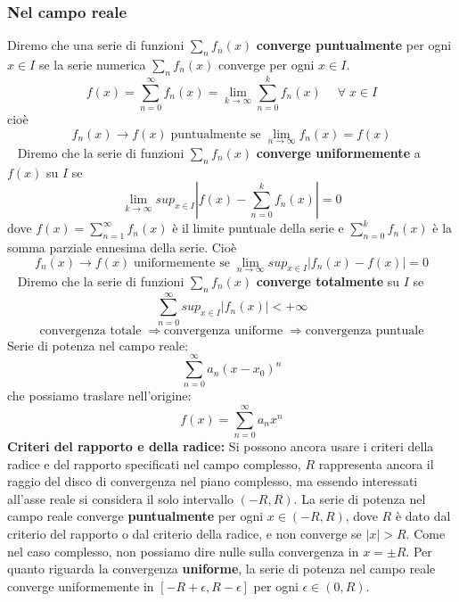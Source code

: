 \subsubsection{Nel campo reale}
Diremo che una serie di funzioni $\sum_{n}f_n(x)$ \textbf{converge puntualmente} per ogni $x \in I$ se la serie numerica $\sum_{n}f_n(x)$ converge per ogni $x \in I$.
\[
    f(x) = \sum_{n=0}^{\infty} f_n(x) = \lim_{k\rightarrow \infty} \sum_{n=0}^{k} f_n(x) \quad \;\forall\;x \in I
\]
cioè
\[
    f_n(x) \rightarrow f(x) \; \text{puntualmente se}\; \lim_{n\rightarrow \infty} f_n(x) = f(x) 
\]
\ \newline
Diremo che la serie di funzioni $\sum_{n}f_n(x)$ \textbf{converge uniformemente} a $f(x)$ su $I$ se
\[
    \lim_{k\rightarrow \infty} sup_{x \in I}\left| f(x) - \sum_{n=0}^{k}f_n(x) \right| = 0
\]
dove $f(x) = \sum_{n=1}^{\infty} f_n(x)$ è il limite puntuale della serie e $\sum_{n=0}^{k} f_n(x)$ è la somma parziale ennesima della serie.\newline
Cioè
\[
    f_n(x) \rightarrow f(x) \; \text{uniformemente se}\; \lim_{n\rightarrow \infty} sup_{x \in I}\left| f_n(x) - f(x) \right| = 0
\]
\ \newline
Diremo che la serie di funzioni $\sum_{n}f_n(x)$ \textbf{converge totalmente} su $I$ se
\[
    \sum_{n=0}^{\infty} sup_{x \in I}\left| f_n(x) \right| < + \infty
\]
\newline
\[
    \text{convergenza totale}\; \Longrightarrow \text{convergenza uniforme}\; \Longrightarrow \text{convergenza puntuale}
\]
\newline
Serie di potenza nel campo reale:
\[
    \sum_{n=0}^{\infty} a_n(x-x_0)^n
\]
che possiamo traslare nell'origine:
\[
    f(x) = \sum_{n=0}^{\infty} a_n x^n
\]
\newline
\textbf{Criteri del rapporto e della radice:} Si possono ancora usare i criteri della radice e del rapporto specificati nel campo complesso, $R$ rappresenta ancora il raggio del disco di convergenza nel piano complesso, ma essendo interessati all'asse reale si considera il solo intervallo $(-R, R)$.\newline
La serie di potenza nel campo reale converge \textbf{puntualmente} per ogni $x \in (-R, R)$, dove $R$ è dato dal criterio del rapporto o dal criterio della radice, e non converge se $|x| > R$.\newline
Come nel caso complesso, non possiamo dire nulle sulla convergenza in $x = \pm R$.\newline
Per quanto riguarda la convergenza \textbf{uniforme}, la serie di potenza nel campo reale converge uniformemente in $[-R+\epsilon, R- \epsilon]$ per ogni $\epsilon \in (0,R)$.\newline
